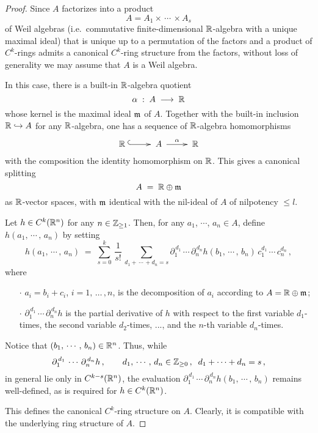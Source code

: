 \documentclass[11pt]{article}
\numberwithin{equation}{subsection}
\begin{document}
\begin{proof}
 Since $A$ factorizes into a product
   $$
     A = A_1\times\,\cdots\,\times A_s
   $$
  of Weil algebras
    (i.e.\ commutative finite-dimensional ${\Bbb R}$-algebra with a unique maximal ideal)
  that is unique up to a permutation of the factors
  and  a product of $C^k$-rings admits a canonical $C^k$-ring structure from the factors,
 without loss of generality we may assume that  $A$ is a Weil algebra.

 In this case, there is a built-in ${\Bbb R}$-algebra quotient
   $$
     \alpha\; :\;  A\; \longrightarrow\; {\Bbb R}
   $$
   whose kernel is the maximal ideal ${\frak m}$ of $A$.
 Together with the built-in inclusion ${\Bbb R}\hookrightarrow A$  for any ${\Bbb R}$-algebra,
  one has a sequence of ${\Bbb R}$-algebra homomorphisms
  $$
   \xymatrix{
    {\Bbb R}\;  \ar@{^{(}->}[r]   & \;A\; \ar[r]^-{\alpha}    & \;{\Bbb R}
	}
  $$
  with the composition the identity homomorphism on ${\Bbb R}$.
 This gives a canonical splitting
  $$
    A\;=\; {\Bbb R}\oplus {\frak m}
  $$
  as ${\Bbb R}$-vector spaces, with ${\frak m}$
      identical with the nil-ideal of $A$ of nilpotency $\le l$.

 Let $h\in C^k({\Bbb R}^n)$  for any $n\in {\Bbb Z}_{\ge 1}$.
 Then,
  for any $a_1$, $\cdots$, $a_n\in A$,
  define  $h(a_1,\,\cdots\,,\,a_n)$ by setting
  $$
    h(a_1,\,\cdots\,,\,a_n)\; =\;
	  \sum_{s=0}^k\,\frac{1}{s!}\,
	    \sum_{d_1+\,\cdots\,+d_n=s}
	     \partial_1^{\,d_1}\,\cdots\,\partial_n^{\,d_n}  h(b_1,\,\cdots\,,\, b_n)\,
		  c_1^{d_1}\,\cdots\,c_n^{d_n}\,,	
  $$
  where
    \begin{itemize}
	  \item[\LARGE $\cdot$]
       $a_i=b_i+c_i$, $i=1,\,\ldots\,,n$,
        is the decomposition of $a_i$ according to $A={\Bbb R}\oplus {\frak m}$;
		
	  \item[\LARGE $\cdot$]	
	  	$\partial_1^{\,d_1}\,\cdots\,\partial_n^{\,d_n}  h$
       is the partial derivative of $h$ with respect to the first variable $d_1$-times, the second variable $d_2$-times,
	    ..., and the $n$-th variable $d_n$-times.
	\end{itemize}	
 Notice that $(b_1,\,\cdots\,,\,b_n)\in {\Bbb R}^n$.
 Thus,
  while
    $$
      \partial_1^{\,d_1}\,\cdots\,\partial_n^{\,d_n}  h\,, \hspace{2em}
         d_1,\,\cdots\,,\,d_n\in {\Bbb Z}_{\ge 0}\,, \;\; d_1+\cdots+d_n=s\,,
    $$		
    in general lie only in $C^{k-s}({\Bbb R}^n)$,
  the evaluation
   $\partial_1^{\,d_1}\,\cdots\,\partial_n^{\,d_n}  h (b_1,\,\cdots\,,\,b_n)$
   remains well-defined,
  as is required for $h\in C^k({\Bbb R}^n)$.

 This defines the canonical $C^k$-ring structure on $A$.
 Clearly, it is compatible with the underlying ring structure of $A$.

\end{proof}
\end{document}
